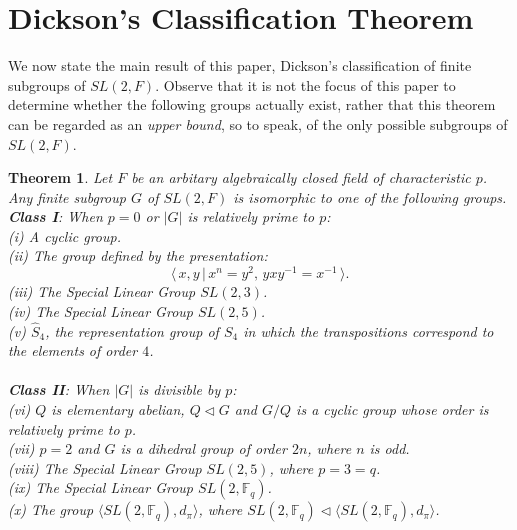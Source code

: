 \documentclass[a4paper , 11pt]{book}
\newtheorem{theorem}{Theorem}[chapter]
\theoremstyle{definition}
\theoremstyle{remark}
\begin{document}
\section{Dickson's Classification Theorem}

We now state the main result of this paper, Dickson's classification of finite subgroups of $SL(2,F)$. Observe that it is not the focus of this paper to determine whether the following groups actually exist, rather that this theorem can be regarded as an \textit{upper bound}, so to speak, of the only possible subgroups of $SL(2,F)$.\\

\begin{theorem}\label{mainresult} Let $F$ be an arbitary algebraically closed field of characteristic $p$. Any finite subgroup $G$ of $SL(2,F)$ is isomorphic to one of the following groups. \vspace{3mm} \\
\textbf{Class I}: When $p=0$ or $|G|$ is relatively prime to $p$: \vspace{1mm} \\
(i) A cyclic group. \vspace{3mm} \\
(ii) The group defined by the presentation:
\begin{equation*} \langle \, x,y \, | \, x^n = y^2, \, yxy^{-1} = x^{-1} \, \rangle.
\end{equation*}
(iii) The Special Linear Group $SL(2,3)$. \vspace{3mm} \\
(iv) The Special Linear Group $SL(2,5)$. \vspace{3mm} \\
(v) $\widehat{S}_4$, the representation group of $S_4$ in which the transpositions correspond to the elements of order $4$. \\
\\
\textbf{Class II}: When $|G|$ is divisible by $p$: \vspace{1mm} \\
(vi) $Q$ is elementary abelian, $Q \vartriangleleft G$ and $G/Q$ is a cyclic group whose order is relatively prime to $p$. \vspace{3mm} \\
(vii) $p=2$ and $G$ is a dihedral group of order $2n$, where $n$ is odd. \vspace{3mm} \\
(viii) The Special Linear Group $SL(2,5)$, where $p=3=q$. \vspace{3mm} \\
(ix) The Special Linear Group $SL(2,\mathbb{F}_q)$. \vspace{3mm} \\
(x) The group $\langle SL(2,\mathbb{F}_q), d_\pi \rangle$, where $SL(2,\mathbb{F}_q) \vartriangleleft \langle SL(2,\mathbb{F}_q), d_\pi \rangle$. \vspace{3mm} \\


\end{theorem}
\end{document}
